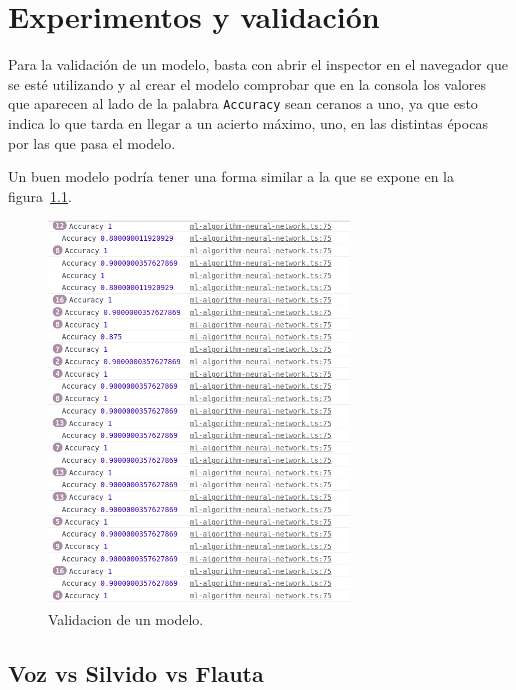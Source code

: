 \documentclass[a4paper, 12pt]{book}
\begin{document}

\cleardoublepage
\chapter{Experimentos y validación}
\label{chap:experimentos-validacion}

Para la validación de un modelo, basta con abrir el inspector en el navegador que se esté utilizando y al crear el modelo comprobar que en la consola los valores que aparecen al lado de la palabra \texttt{Accuracy} sean ceranos a uno, ya que esto indica lo que tarda en llegar a un acierto máximo, uno, en las distintas épocas por las que pasa el modelo.

Un buen modelo podría tener una forma similar a la que se expone en la figura~\ref{fig:validacion}.

\begin{figure}
	\centering
	\includegraphics[width=8cm, keepaspectratio]{img/validacion.png}
	\caption{Validacion de un modelo.}\label{fig:validacion}
\end{figure}

\section{Voz vs Silvido vs Flauta}
\label{sec:yo-silv-flauta}
\end{document}
